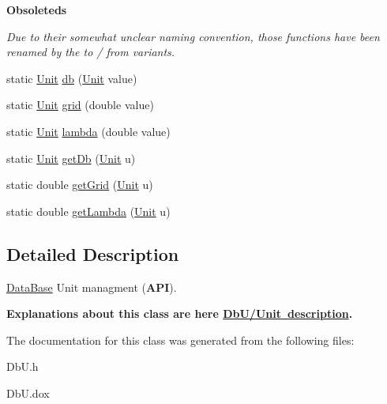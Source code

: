 \begin{Indent}\textbf{ Obsoleteds}\par
{\em Due to their somewhat unclear naming convention, those functions have been renamed by the {\itshape to} / {\itshape from} variants. }\begin{DoxyCompactItemize}
\item 
static \mbox{\hyperlink{group__DbUGroup_ga4fbfa3e8c89347af76c9628ea06c4146}{Unit}} \mbox{\hyperlink{group__DbUGroup_gacd77957381fb93fc4203bdca215e0b48}{db}} (\mbox{\hyperlink{group__DbUGroup_ga4fbfa3e8c89347af76c9628ea06c4146}{Unit}} value)
\item 
static \mbox{\hyperlink{group__DbUGroup_ga4fbfa3e8c89347af76c9628ea06c4146}{Unit}} \mbox{\hyperlink{group__DbUGroup_ga1d4bac6e3b68c8cd44b345de3b425753}{grid}} (double value)
\item 
static \mbox{\hyperlink{group__DbUGroup_ga4fbfa3e8c89347af76c9628ea06c4146}{Unit}} \mbox{\hyperlink{group__DbUGroup_gaa1ba98acc939ff1c370c18544a5e0dce}{lambda}} (double value)
\item 
static \mbox{\hyperlink{group__DbUGroup_ga4fbfa3e8c89347af76c9628ea06c4146}{Unit}} \mbox{\hyperlink{group__DbUGroup_ga4233772b1b3e68f3ec723c7509ea87ff}{get\+Db}} (\mbox{\hyperlink{group__DbUGroup_ga4fbfa3e8c89347af76c9628ea06c4146}{Unit}} u)
\item 
static double \mbox{\hyperlink{group__DbUGroup_gad4485d0d7b5fd7ae87b32f165155c0a2}{get\+Grid}} (\mbox{\hyperlink{group__DbUGroup_ga4fbfa3e8c89347af76c9628ea06c4146}{Unit}} u)
\item 
static double \mbox{\hyperlink{group__DbUGroup_gadea6b9a6e84243f70f3a5e2725b2c6d8}{get\+Lambda}} (\mbox{\hyperlink{group__DbUGroup_ga4fbfa3e8c89347af76c9628ea06c4146}{Unit}} u)
\end{DoxyCompactItemize}
\end{Indent}


\subsection{Detailed Description}
\mbox{\hyperlink{classHurricane_1_1DataBase}{Data\+Base}} Unit managment ({\bfseries A\+PI}). 

{\bfseries Explanations about this class are here \mbox{\hyperlink{group__DbUGroup}{Db\+U/\+Unit description}}.} 

The documentation for this class was generated from the following files\+:\begin{DoxyCompactItemize}
\item 
Db\+U.\+h\item 
Db\+U.\+dox\end{DoxyCompactItemize}
